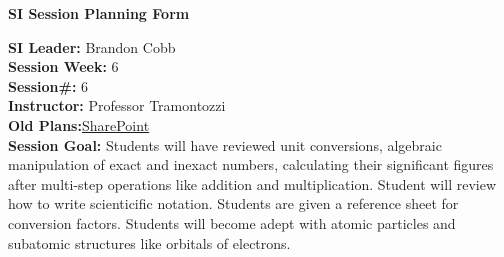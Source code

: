 \documentclass{article}
\begin{document}
\begin{center}
    {\LARGE\textbf{SI Session Planning Form}}
\end{center}

\vspace{0.5cm}

\noindent
\begin{flushleft}
\textbf{SI Leader:} Brandon Cobb\\
\textbf{Session Week:} 6\\
\textbf{Session\#:} 6\\
\textbf{Instructor:} Professor Tramontozzi\\
\textbf{Old Plans:}\href{https://macombedu.sharepoint.com/:b:/s/ASC-SupplementalInstructionEmbeddedTutoring/EeSYqCwT_KhMolgJvXbVEjgBOyF_DevvS8BgCm1zPkQQJg?e=QJTt4o}{SharePoint}\\
\textbf{Session Goal:} Students will have reviewed unit conversions, algebraic manipulation of exact and inexact numbers, calculating their significant figures after multi-step operations like addition and multiplication. Student will review how to write scienticific notation. Students are given a reference sheet for conversion factors. Students will become adept with atomic particles and subatomic structures like orbitals of electrons. 
\end{flushleft}

\vspace{1em}
\end{document}
